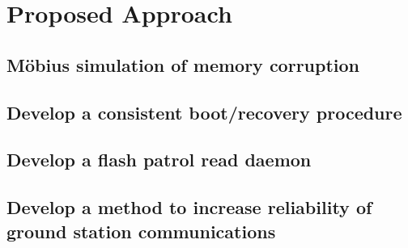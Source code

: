 \section{Proposed Approach}
\subsection{M\"obius simulation of memory corruption}

\subsection{Develop a consistent boot/recovery procedure}

\subsection{Develop a flash patrol read daemon}

\subsection{Develop a method to increase reliability of ground station
communications}

